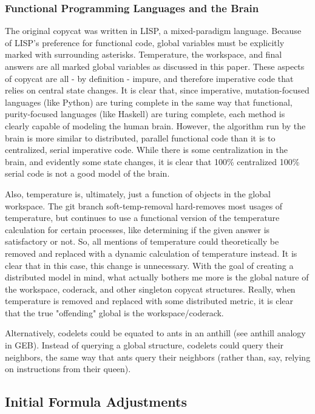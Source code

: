 \documentclass[a4paper]{article}
\begin{document}
\subsubsection{Functional Programming Languages and the Brain}

    The original copycat was written in LISP, a mixed-paradigm language.
    Because of LISP's preference for functional code, global variables must be explicitly marked with surrounding asterisks.
    Temperature, the workspace, and final answers are all marked global variables as discussed in this paper.
    These aspects of copycat are all - by definition - impure, and therefore imperative code that relies on central state changes.
    It is clear that, since imperative, mutation-focused languages (like Python) are turing complete in the same way that functional, purity-focused languages (like Haskell) are turing complete, each method is clearly capable of modeling the human brain.
    However, the algorithm run by the brain is more similar to distributed, parallel functional code than it is to centralized, serial imperative code.
    While there is some centralization in the brain, and evidently some state changes, it is clear that 100\% centralized 100\% serial code is not a good model of the brain.

    Also, temperature is, ultimately, just a function of objects in the global workspace.
    The git branch soft-temp-removal hard-removes most usages of temperature, but continues to use a functional version of the temperature calculation for certain processes, like determining if the given answer is satisfactory or not.
    So, all mentions of temperature could theoretically be removed and replaced with a dynamic calculation of temperature instead.
    It is clear that in this case, this change is unnecessary.
    With the goal of creating a distributed model in mind, what actually bothers me more is the global nature of the workspace, coderack, and other singleton copycat structures.
    Really, when temperature is removed and replaced with some distributed metric, it is clear that the true "offending" global is the workspace/coderack.

    Alternatively, codelets could be equated to ants in an anthill (see anthill analogy in GEB).
    Instead of querying a global structure, codelets could query their neighbors, the same way that ants query their neighbors (rather than, say, relying on instructions from their queen).

\subsection{Initial Formula Adjustments}
\end{document}
